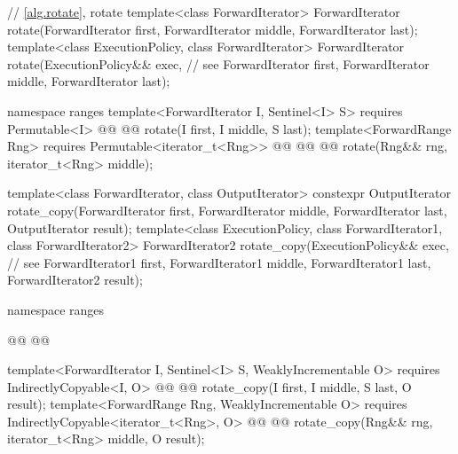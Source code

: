 \begin{codeblock}
  // \ref{alg.rotate}, rotate
  template<class ForwardIterator>
    ForwardIterator rotate(ForwardIterator first,
                           ForwardIterator middle,
                           ForwardIterator last);
  template<class ExecutionPolicy, class ForwardIterator>
    ForwardIterator rotate(ExecutionPolicy&& exec, // see 
                           ForwardIterator first,
                           ForwardIterator middle,
                           ForwardIterator last);
\end{codeblock}\begin{addedblock}\begin{codeblock}
  namespace ranges {
    template<ForwardIterator I, Sentinel<I> S>
      requires Permutable<I>
      @@
      @@
        rotate(I first, I middle, S last);
    template<ForwardRange Rng>
      requires Permutable<iterator_t<Rng>>
      @@
                  @@
      @@
        rotate(Rng&& rng, iterator_t<Rng> middle);
  }
\end{codeblock}\end{addedblock}\begin{codeblock}
  template<class ForwardIterator, class OutputIterator>
    constexpr OutputIterator
      rotate_copy(ForwardIterator first, ForwardIterator middle,
                  ForwardIterator last, OutputIterator result);
  template<class ExecutionPolicy, class ForwardIterator1, class ForwardIterator2>
    ForwardIterator2
      rotate_copy(ExecutionPolicy&& exec, // see 
                  ForwardIterator1 first, ForwardIterator1 middle,
                  ForwardIterator1 last, ForwardIterator2 result);
\end{codeblock}\begin{addedblock}\begin{codeblock}
  namespace ranges {
    @@
    @@

    template<ForwardIterator I, Sentinel<I> S, WeaklyIncrementable O>
      requires IndirectlyCopyable<I, O>
      @@
      @@
        rotate_copy(I first, I middle, S last, O result);
    template<ForwardRange Rng, WeaklyIncrementable O>
      requires IndirectlyCopyable<iterator_t<Rng>, O>
      @@
      @@
        rotate_copy(Rng&& rng, iterator_t<Rng> middle, O result);
  }
\end{codeblock}\end{addedblock}\begin{codeblock}


\end{codeblock}
